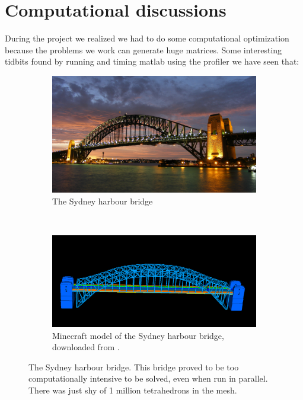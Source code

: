 \section{Computational discussions}

During the project we realized we had to do some computational optimization because the problems we work can generate huge matrices. Some interesting tidbits found by running and timing matlab using the profiler we have seen that:


\begin{figure}[ht]
        \centering
        \begin{subfigure}[b]{0.45 \textwidth}
                \includegraphics[width=\textwidth]{Sydney_pic}
                \caption{The Sydney harbour bridge}
        \end{subfigure}
        ~
        \begin{subfigure}[b]{0.45 \textwidth}
                \includegraphics[width=\textwidth]{sydneyBridge}
                \caption{Minecraft model of the Sydney harbour bridge, downloaded from \cite{sydneyBridge}.}
        \end{subfigure}
        \caption{The Sydney harbour bridge. This bridge proved to be too computationally intensive to be solved, even when run in parallel. There was just shy of 1 million tetrahedrons in the mesh.}
        \label{fig:sydney}
\end{figure}



